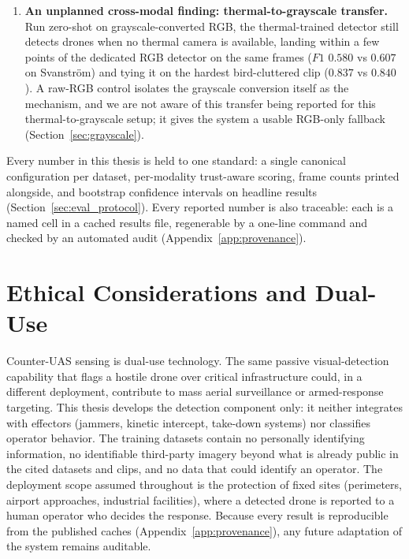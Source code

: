 \begin{enumerate}
    \item \textbf{An unplanned cross-modal finding: thermal-to-grayscale transfer.} Run zero-shot on grayscale-converted RGB, the thermal-trained detector still detects drones when no thermal camera is available, landing within a few points of the dedicated RGB detector on the same frames ($F1$ $0.580$ vs $0.607$ on Svanstr\"om) and tying it on the hardest bird-cluttered clip ($0.837$ vs $0.840$). A raw-RGB control isolates the grayscale conversion itself as the mechanism, and we are not aware of this transfer being reported for this thermal-to-grayscale setup; it gives the system a usable RGB-only fallback (Section~\ref{sec:grayscale}).
\end{enumerate}

Every number in this thesis is held to one standard: a single canonical configuration per dataset, per-modality trust-aware scoring, frame counts printed alongside, and bootstrap confidence intervals on headline results (Section~\ref{sec:eval_protocol}). Every reported number is also traceable: each is a named cell in a cached results file, regenerable by a one-line command and checked by an automated audit (Appendix~\ref{app:provenance}).

\section{Ethical Considerations and Dual-Use}
\label{sec:ethics}

Counter-UAS sensing is dual-use technology. The same passive visual-detection capability that flags a hostile drone over critical infrastructure could, in a different deployment, contribute to mass aerial surveillance or armed-response targeting. This thesis develops the detection component only: it neither integrates with effectors (jammers, kinetic intercept, take-down systems) nor classifies operator behavior. The training datasets contain no personally identifying information, no identifiable third-party imagery beyond what is already public in the cited datasets and clips, and no data that could identify an operator. The deployment scope assumed throughout is the protection of fixed sites (perimeters, airport approaches, industrial facilities), where a detected drone is reported to a human operator who decides the response. Because every result is reproducible from the published caches (Appendix~\ref{app:provenance}), any future adaptation of the system remains auditable.

